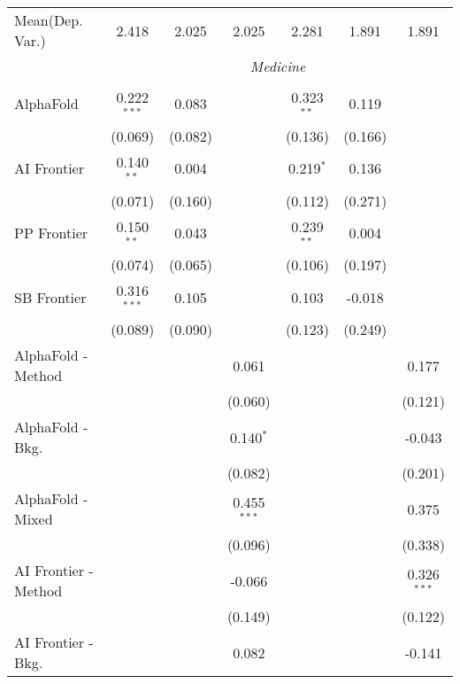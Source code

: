 \begin{tabular}{lcccccc}
Mean(Dep. Var.) & 2.418 & 2.025 & 2.025 & 2.281 & 1.891 & 1.891 \\
 & \multicolumn{6}{c}{\textit{Medicine}} \\ \\
   AlphaFold            & 0.222$^{***}$ & 0.083   &                & 0.323$^{**}$ & 0.119   &   \\   
                        & (0.069)       & (0.082) &                & (0.136)      & (0.166) &   \\   
   AI Frontier          & 0.140$^{**}$  & 0.004   &                & 0.219$^{*}$  & 0.136   &   \\   
                        & (0.071)       & (0.160) &                & (0.112)      & (0.271) &   \\   
   PP Frontier          & 0.150$^{**}$  & 0.043   &                & 0.239$^{**}$ & 0.004   &   \\   
                        & (0.074)       & (0.065) &                & (0.106)      & (0.197) &   \\   
   SB Frontier          & 0.316$^{***}$ & 0.105   &                & 0.103        & -0.018  &   \\   
                        & (0.089)       & (0.090) &                & (0.123)      & (0.249) &   \\   
   AlphaFold - Method   &               &         & 0.061          &              &         & 0.177\\   
                        &               &         & (0.060)        &              &         & (0.121)\\   
   AlphaFold - Bkg.     &               &         & 0.140$^{*}$    &              &         & -0.043\\   
                        &               &         & (0.082)        &              &         & (0.201)\\   
   AlphaFold - Mixed    &               &         & 0.455$^{***}$  &              &         & 0.375\\   
                        &               &         & (0.096)        &              &         & (0.338)\\   
   AI Frontier - Method &               &         & -0.066         &              &         & 0.326$^{***}$\\   
                        &               &         & (0.149)        &              &         & (0.122)\\   
   AI Frontier - Bkg.   &               &         & 0.082          &              &         & -0.141\\   

\end{tabular}
